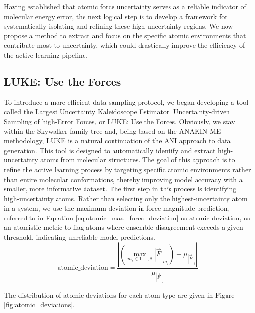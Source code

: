Having established that atomic force uncertainty serves as a reliable indicator of molecular energy error, the next logical step is to develop a framework for systematically isolating and refining these high-uncertainty regions. 
We now propose a method to extract and focus on the specific atomic environments that contribute most to uncertainty, which could drastically improve the efficiency of the active learning pipeline.

\subsection{LUKE: Use the Forces}
\label{subsec:luke}

To introduce a more efficient data sampling protocol, we began developing a tool called the Largest Uncertainty Kaleidoscope Estimator: Uncertainty-driven Sampling of high-Error Forces, or LUKE: Use the Forces.
Obviously, we stay within the Skywalker family tree and, being based on the ANAKIN-ME methodology, LUKE is a natural continuation of the ANI approach to data generation.
This tool is designed to automatically identify and extract high-uncertainty atoms from molecular structures. 
The goal of this approach is to refine the active learning process by targeting specific atomic environments rather than entire molecular conformations, thereby improving model accuracy with a smaller, more informative dataset. 
The first step in this process is identifying high-uncertainty atoms. 
Rather than selecting only the highest-uncertainty atom in a system, we use the maximum deviation in force magnitude prediction, referred to in Equation \ref{eq:atomic_max_force_deviation} as $\text{atomic\_deviation}$, as an atomistic metric to flag atoms where ensemble disagreement exceeds a given threshold, indicating unreliable model predictions. 
\begin{equation} 
\text{atomic\_deviation} = 
\frac{\left| \left(\max\limits_{m_i \in {1, \dots, 8}} |\vec{F}|_{m_i} \right)- {\mu_{|\vec{F}|_i}} \right|}{\mu_{|\vec{F}|_i}} 
\label{eq:atomic_max_force_deviation}
\end{equation}

The distribution of atomic deviations for each atom type are given in Figure \ref{fig:atomic_deviations}.

